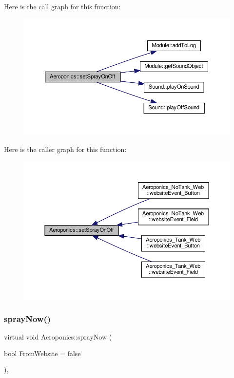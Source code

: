 Here is the call graph for this function\+:
\nopagebreak
\begin{figure}[H]
\begin{center}
\leavevmode
\includegraphics[width=350pt]{class_aeroponics_a459d83fc32d3369938be2953138c9b96_cgraph}
\end{center}
\end{figure}
Here is the caller graph for this function\+:
\nopagebreak
\begin{figure}[H]
\begin{center}
\leavevmode
\includegraphics[width=350pt]{class_aeroponics_a459d83fc32d3369938be2953138c9b96_icgraph}
\end{center}
\end{figure}
\mbox{\label{class_aeroponics_aecda76aae20ce45fd9a080770cf07e56}} 
\subsubsection{\texorpdfstring{spray\+Now()}{sprayNow()}\hspace{0.1cm}{\footnotesize\ttfamily [1/2]}}
{\footnotesize\ttfamily virtual void Aeroponics\+::spray\+Now (\begin{DoxyParamCaption}\item[{bool}]{From\+Website = {\ttfamily false} }\end{DoxyParamCaption})\hspace{0.3cm}{\ttfamily [protected]}, {}}



